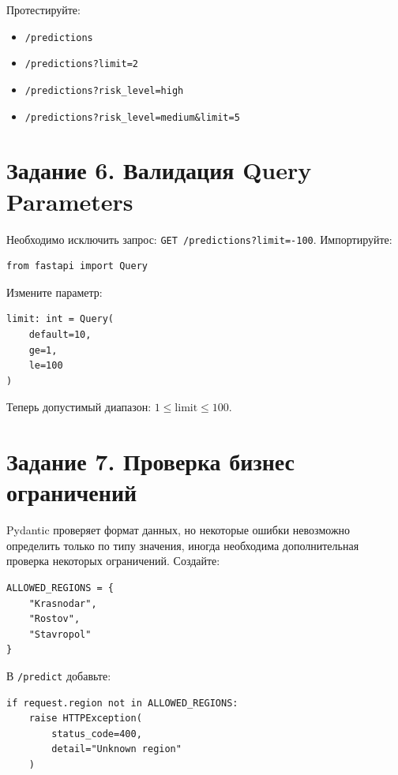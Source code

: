 \documentclass[12pt,a4paper]{article}
\begin{document}
Протестируйте:

\begin{itemize}
    \item \texttt{/predictions}
    \item \texttt{/predictions?limit=2}
    \item \texttt{/predictions?risk\_level=high}
    \item \texttt{/predictions?risk\_level=medium\&limit=5}
\end{itemize}

\section{Задание 6. Валидация Query Parameters}

Необходимо исключить запрос: \texttt{GET /predictions?limit=-100}. Импортируйте:

\begin{lstlisting}[caption={Импорт Query}]
from fastapi import Query
\end{lstlisting}

Измените параметр:

\begin{lstlisting}[caption={Валидация limit}]
limit: int = Query(
    default=10,
    ge=1,
    le=100
)
\end{lstlisting}

Теперь допустимый диапазон: $1 \le \text{limit} \le 100$.

\section{Задание 7. Проверка бизнес ограничений}

Pydantic проверяет формат данных, но некоторые ошибки невозможно определить только по типу значения, иногда необходима дополнительная проверка некоторых ограничений. Создайте:

\begin{lstlisting}[caption={Множество допустимых регионов}]
ALLOWED_REGIONS = {
    "Krasnodar",
    "Rostov",
    "Stavropol"
}
\end{lstlisting}

В \texttt{/predict} добавьте:

\begin{lstlisting}[caption={Бизнес-валидация региона}]
if request.region not in ALLOWED_REGIONS:
    raise HTTPException(
        status_code=400,
        detail="Unknown region"
    )
\end{lstlisting}
\end{document}
